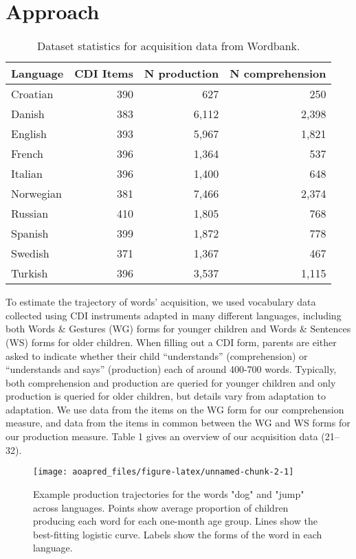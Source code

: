 \documentclass[english,man]{apa6}
\theoremstyle{definition}
\theoremstyle{definition}
\theoremstyle{definition}
\theoremstyle{remark}
\begin{document}
\section*{Approach}\label{approach}

\begin{table}[b]
\centering
\begin{tabular}{lrrr}
  \hline
Language & CDI Items & N production & N comprehension \\ 
  \hline
Croatian & 390 & 627 & 250 \\ 
  Danish & 383 & 6,112 & 2,398 \\ 
  English & 393 & 5,967 & 1,821 \\ 
  French & 396 & 1,364 & 537 \\ 
  Italian & 396 & 1,400 & 648 \\ 
  Norwegian & 381 & 7,466 & 2,374 \\ 
  Russian & 410 & 1,805 & 768 \\ 
  Spanish & 399 & 1,872 & 778 \\ 
  Swedish & 371 & 1,367 & 467 \\ 
  Turkish & 396 & 3,537 & 1,115 \\ 
   \hline
\end{tabular}
\caption{Dataset statistics for acquisition data from Wordbank.} 
\label{table:lang_stats}
\end{table}

To estimate the trajectory of words' acquisition, we used vocabulary
data collected using CDI instruments adapted in many different
languages, including both Words \& Gestures (WG) forms for younger
children and Words \& Sentences (WS) forms for older children. When
filling out a CDI form, parents are either asked to indicate whether
their child \enquote{understands} (comprehension) or
\enquote{understands and says} (production) each of around 400-700
words. Typically, both comprehension and production are queried for
younger children and only production is queried for older children, but
details vary from adaptation to adaptation. We use data from the items
on the WG form for our comprehension measure, and data from the items in
common between the WG and WS forms for our production measure. Table 1
gives an overview of our acquisition data (21--32).

\begin{figure*}

{\centering \texttt{[image: aoapred\_files/figure-latex/unnamed-chunk-2-1]} 

}

\caption{Example production trajectories for the words "dog" and "jump" across languages. Points show average proportion of children producing each word for each one-month age group. Lines show the best-fitting logistic curve. Labels show the forms of the word in each language.}\label{fig:unnamed-chunk-2}
\end{figure*}
\end{document}
